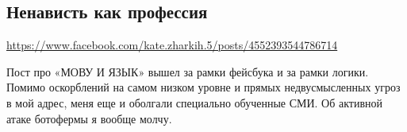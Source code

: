  
 
 
 
 

\subsection{Ненависть как профессия}
\label{sec:23_06_2020.fb.zharkih_ekaterina.1.mova_jazyk}
\url{https://www.facebook.com/kate.zharkih.5/posts/4552393544786714}

Пост про «МОВУ И ЯЗЫК» вышел за рамки фейсбука и за рамки логики. Помимо
оскорблений на самом низком уровне и прямых недвусмысленных угроз в мой адрес,
меня еще и оболгали специально обученные СМИ. Об активной атаке ботофермы я
вообще молчу.

